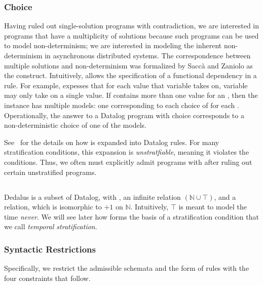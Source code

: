 
\subsubsection{Choice}
Having ruled out single-solution programs with contradiction, we are interested in programs that have a multiplicity of solutions because such programs can be used to model non-determinism; we are interested in modeling the inherent non-determinism in asynchronous distributed systems.  The correspondence between multiple solutions and non-determinism was formalized by Sacc\`{a} and Zaniolo  as the  construct.  Intuitively,  allows the specification of a functional dependency in a rule.  For example,  expesses that for each value that variable  takes on, variable  may only take on a single value.  If  contains more than one  value for an , then the instance has multiple models: one corresponding to each choice of  for each .  Operationally, the answer to a Datalog program with choice corresponds to a non-deterministic choice of one of the models.

See~\cite{greedychoice} for the details on how  is expanded into Datalog rules.  For many stratification conditions, this expansion is {\em unstratfiable}, meaning it violates the conditions.  Thus, we often must explicitly admit programs with  after ruling out certain unstratified programs.

\subsection{\lang}
Dedalus is a subset of Datalog, with , an infinite  relation $(\mathbb{N} \cup \top)$, and a  relation, which is isomorphic to $+1$ on $\mathbb{N}$.  Intuitively, $\top$ is meant to model the time {\em never}.  We will see later how  forms the basis of a stratification condition that we call {\em temporal stratification}.

\subsubsection{Syntactic Restrictions}
\label{sec:syntaxrestrictions}

Specifically, we restrict the admissible schemata  and the form of rules with the four constraints that follow.

